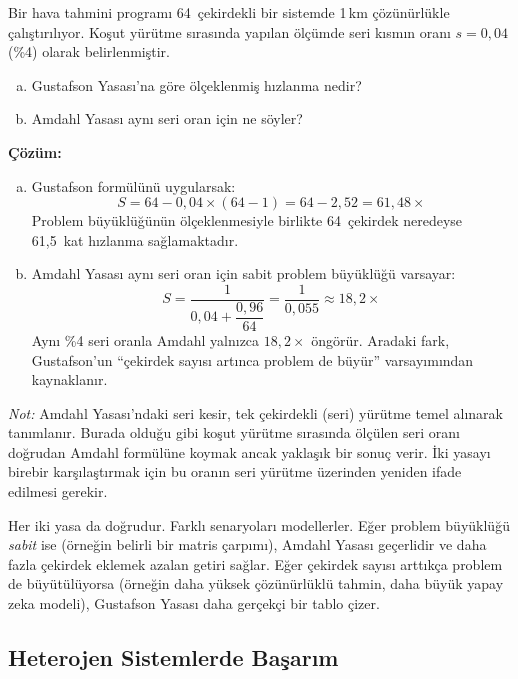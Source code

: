 \begin{ornek}[2.11]
Bir hava tahmini programı 64~çekirdekli bir sistemde 1\,km çözünürlükle çalıştırılıyor. Koşut yürütme sırasında yapılan ölçümde seri kısmın oranı $s = 0{,}04$ (\%4) olarak belirlenmiştir.
\begin{enumerate}[(a)]
    \item Gustafson Yasası'na göre ölçeklenmiş hızlanma nedir?
    \item Amdahl Yasası aynı seri oran için ne söyler?
\end{enumerate}

\textbf{Çözüm:}
\begin{enumerate}[(a)]
    \item Gustafson formülünü uygularsak:
    \[
    S = 64 - 0{,}04 \times (64 - 1) = 64 - 2{,}52 = 61{,}48\times
    \]
    Problem büyüklüğünün ölçeklenmesiyle birlikte 64~çekirdek neredeyse 61,5~kat hızlanma sağlamaktadır.

    \item Amdahl Yasası aynı seri oran için sabit problem büyüklüğü varsayar:
    \[
    S = \frac{1}{0{,}04 + \dfrac{0{,}96}{64}} = \frac{1}{0{,}055} \approx 18{,}2\times
    \]
    Aynı \%4 seri oranla Amdahl yalnızca $18{,}2\times$ öngörür. Aradaki fark, Gustafson'un ``çekirdek sayısı artınca problem de büyür'' varsayımından kaynaklanır.
\end{enumerate}

\noindent\emph{Not:} Amdahl Yasası'ndaki seri kesir, tek çekirdekli (seri) yürütme temel alınarak tanımlanır. Burada olduğu gibi koşut yürütme sırasında ölçülen seri oranı doğrudan Amdahl formülüne koymak ancak yaklaşık bir sonuç verir. İki yasayı birebir karşılaştırmak için bu oranın seri yürütme üzerinden yeniden ifade edilmesi gerekir.
\end{ornek}

\begin{bilginot}
Her iki yasa da doğrudur. Farklı senaryoları modellerler. Eğer problem büyüklüğü \emph{sabit} ise (örneğin belirli bir matris çarpımı), Amdahl Yasası geçerlidir ve daha fazla çekirdek eklemek azalan getiri sağlar. Eğer çekirdek sayısı arttıkça problem de büyütülüyorsa (örneğin daha yüksek çözünürlüklü tahmin, daha büyük yapay zeka modeli), Gustafson Yasası daha gerçekçi bir tablo çizer.
\end{bilginot}

\subsection{Heterojen Sistemlerde Başarım}
\label{subsec:heterojen-basarim}

